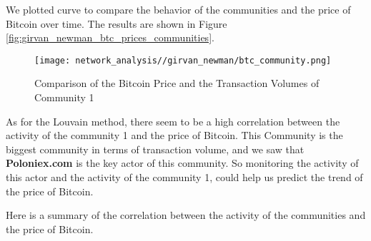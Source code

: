 \documentclass[a4paper, 12pt]{article}
\begin{document}
We plotted curve to compare the behavior of the communities and the price of Bitcoin over time.
The results are shown in Figure \ref{fig:girvan_newman_btc_prices_communities}.

\begin{figure}
    \centering
    \texttt{[image: network\_analysis//girvan\_newman/btc\_community.png]}
    \caption{Comparison of the Bitcoin Price and the Transaction Volumes of Community 1}
\end{figure}

As for the Louvain method, there seem to be a high correlation between the activity of the community 1 and the price of Bitcoin.
This Community is the biggest community in terms of transaction volume, and we saw that \textbf{Poloniex.com} is the key actor of this community.
So monitoring the activity of this actor and the activity of the community 1, could help us predict the trend of the price of Bitcoin.

Here is a summary of the correlation between the activity of the communities and the price of Bitcoin.
\end{document}
